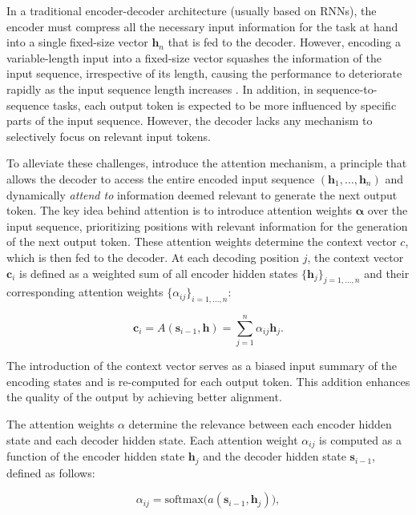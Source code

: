 In a traditional encoder-decoder architecture (usually based on \acp{RNN}), the encoder must compress all the necessary input information for the task at hand into a single fixed-size vector $\bm{h}_n$ that is fed to the decoder. However, encoding a variable-length input into a fixed-size vector squashes the information of the input sequence, irrespective of its length, causing the performance to deteriorate rapidly as the input sequence length increases \citep{cho2014properties}. In addition, in sequence-to-sequence tasks, each output token is expected to be more influenced by specific parts of the input sequence. However, the decoder lacks any mechanism to selectively focus on relevant input tokens.

To alleviate these challenges, \citet{bahdanau2014neural} introduce the attention mechanism, a principle that allows the decoder to access the entire encoded input sequence $(\bm{h}_1, \ldots, \bm{h}_n)$ and dynamically \textit{attend to} information deemed relevant to generate the next output token. The key idea behind attention is to introduce attention weights $\bm{\alpha}$ over the input sequence, prioritizing positions with relevant information for the generation of the next output token. These attention weights determine the context vector $c$, which is then fed to the decoder. At each decoding position $j$, the context vector $\bm{c}_i$ is defined as a weighted sum of all encoder hidden states $\{\bm{h}_j\}_{j=1, \ldots, n}$ and their corresponding attention weights $\{\alpha_{ij}\}_{i=1, \ldots, n}$: 

\begin{equation}
    \bm{c}_i = A(\bm{s}_{i-1}, \bm{h}) = \sum_{j=1}^n \alpha_{ij} \bm{h}_j.
\end{equation}

\noindent The introduction of the context vector serves as a biased input summary of the encoding states and is re-computed for each output token. This addition enhances the quality of the output by achieving better alignment.

The attention weights $\alpha$ determine the relevance between each encoder hidden state and each decoder hidden state. Each attention weight $\alpha_{ij}$ is computed as a function of the encoder hidden state $\bm{h}_j$ and the decoder hidden state $\bm{s}_{i-1}$, defined as follows:

\begin{equation}
    \alpha_{ij} = \textrm{softmax}\bigl(a(\bm{s}_{i-1}, \bm{h}_j)\bigr),
\end{equation}

